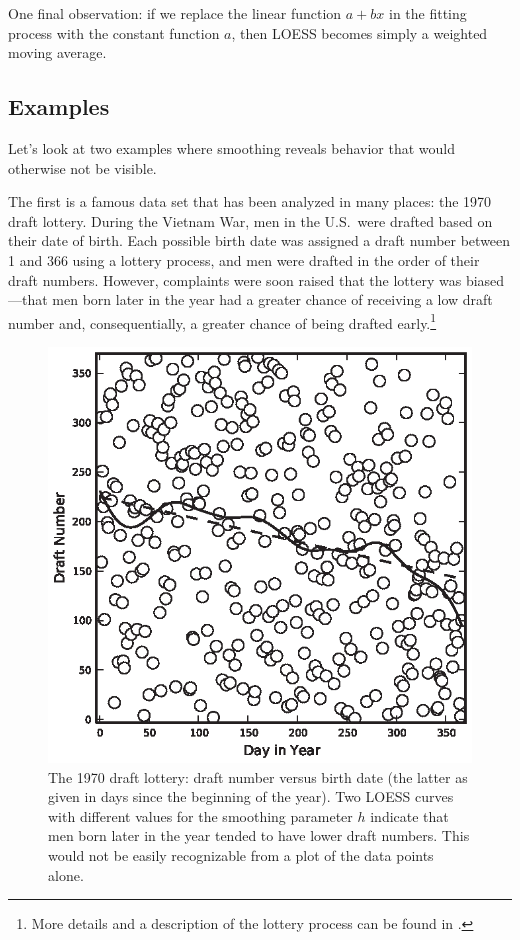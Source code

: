 One final observation: if we replace the linear function $a + bx$ in
the fitting process with the constant function $a$, then LOESS becomes
simply a weighted moving average.

\subsection{Examples}


Let's look at two examples where smoothing reveals behavior that would
otherwise not be visible.

The first is a famous data set that has been analyzed in many places:
the 1970 draft lottery.  During the Vietnam War, men in the
U.S.\ were drafted based on their date of birth. Each possible birth date was
assigned a draft number between 1 and 366 using a lottery process, and
men were drafted in the order of their draft numbers. However,
complaints were soon raised that the lottery was biased---that men
born later in the year had a greater chance of receiving a low draft
number and, consequentially, a greater chance of being drafted
early.\footnote{More details and a description of the lottery process
  can be found in .}

\begin{figure}
\vspace*{-18pt}
  \centerline{\includegraphics[scale=0.9]{img/draftlottery}}
  \caption{The 1970 draft lottery: draft number versus birth date (the
    latter as given in days since the beginning of the year).  Two
    LOESS curves with different values for the smoothing parameter $h$
    indicate that men born later in the year tended to have lower
    draft numbers. This would not be easily recognizable from a plot
    of the data points alone.}
  \label{fig:draftlottery}\vspace*{-6pt}
\end{figure}

